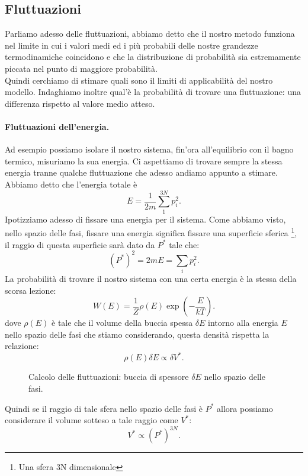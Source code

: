 \subsection{Fluttuazioni}%
Parliamo adesso delle fluttuazioni, abbiamo detto che il nostro metodo funziona nel limite in cui i valori medi ed i più probabili delle nostre grandezze termodinamiche coincidono e che la distribuzione di probabilità sia estremamente piccata nel punto di maggiore probabilità.\\
Quindi cerchiamo di stimare quali sono il limiti di applicabilità del nostro modello. Indaghiamo inoltre qual'è la probabilità di trovare una fluttuazione: una differenza rispetto al valore medio atteso.\\
\paragraph{Fluttuazioni dell'energia.}%
Ad esempio possiamo isolare il nostro sistema, fin'ora all'equilibrio con il bagno termico, misuriamo la sua energia. Ci aspettiamo di trovare sempre la stessa energia tranne qualche fluttuazione che adesso andiamo appunto a stimare. \\
Abbiamo detto che l'energia totale è
\[
	E = \frac{1}{2m}\sum_{1}^{3N} p_{i}^2
.\] 
Ipotizziamo adesso di fissare una energia per il sistema. Come abbiamo visto, nello spazio delle fasi, fissare una energia significa fissare una superficie sferica \footnote{Una sfera 3N dimensionale}, il raggio di questa superficie sarà dato da $P^{*}$ tale che:
\[
	\left( P^* \right)^2 = 2mE = \sum_{i}^{} p_{i}^2
.\] 
La probabilità di trovare il nostro sistema con una certa energia è la stessa della scorsa lezione:
\[
	W\left( E \right) = \frac{1}{Z}\rho\left( E \right) \exp\left( -\frac{E}{kT} \right) 
.\] 
dove $\rho\left( E \right)$ è tale che il volume della buccia spessa $\delta E$ intorno alla energia $E$ nello spazio delle fasi che stiamo considerando, questa densità rispetta la relazione:
\[
	\rho\left( E \right) \delta E \propto \delta V^*
.\]
\begin{figure}[H]
    \centering
    \caption{Calcolo delle fluttuazioni: buccia di spessore $\delta E$ nello spazio delle fasi.}
    \label{fig:calcolo-delle-fluttuazioni}
\end{figure}
\noindent
Quindi se il raggio di tale sfera nello spazio delle fasi è $P^*$ allora possiamo considerare il volume sotteso a tale raggio come  $V^{*}$:
\[
	V^* \propto \left( P^* \right)^{3N}
.\] 
